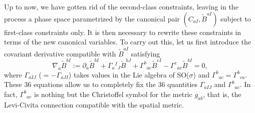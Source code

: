 \documentclass[aps,prd,reprint,showpacs,longbibliography,superscriptaddress, groupedaddres,
titlepage,nofootinbib]{revtex4-1} %
\begin{document}
Up to now, we have gotten rid of the second-class constraints, leaving in the process a phase space parametrized by the canonical pair $(C_{aI},\tilde{B}^{aI})$ subject to first-class constraints only. It is then necessary to rewrite these constraints in terms of the new canonical variables.  To carry out this, let us first introduce the covariant derivative compatible with $\tilde{B}^{aI}$ satisfying
\begin{equation}\label{covder}
\nabla_a \tilde{B}^{bI}:=\partial_a\tilde{B}^{bI}+\Gamma_a{}^I{}_J\tilde{B}^{bJ}+\Gamma^b{}_{ac}\tilde{B}^{cI}-\Gamma^c{}_{ac}\tilde{B}^{bI}=0,
\end{equation}
where $\Gamma_{aIJ}$ ($=-\Gamma_{aJI}$) takes values in the Lie algebra of SO($\sigma$) and $\Gamma^b{}_{ac}=\Gamma^b{}_{ca}$. These 36 equations allow us to completely fix the 36 quantities $\Gamma_{aIJ}$ and $\Gamma^b{}_{ac}$. In fact, $\Gamma^b{}_{ac}$ is nothing but the Christoffel symbol for the metric $g_{ab}$, that is, the Levi-Civita connection compatible with the spatial metric.
\end{document}
